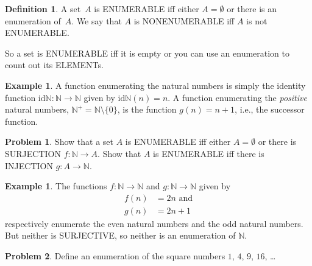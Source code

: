 \documentclass[10pt,a4paper]{article}
\newcommand*{\olup}[1]{\MakeUppercase{#1}}
\theoremstyle{plain}
\theoremstyle{definition}
\newtheorem{defn}[thm]{Definition}
\newtheorem{ex}[thm]{Example}
\newtheorem{prob}{Problem}[section]
\theoremstyle{remark}
\newenvironment{explain}{}{}
\newcommand*{\ollabel}[1]{\label{#1}}
\providecommand{\Nat}{\ensuremath{\mathbb{N}}}
\providecommand{\Id}{\mathrm{id}}
\begin{document}
\begin{defn}
  \ollabel{defn:enumerable}
  A set~$A$ is \olup{enumerable} iff either $A = \emptyset$ or there is
  an enumeration of~$A$. We say that $A$ is \olup{nonenumerable} iff $A$
  is not \olup{enumerable}.
\end{defn}

\begin{explain}
So a set is \olup{enumerable} iff it is empty or you can use an
enumeration to count out its \olup{element}s.
\end{explain}

\begin{ex}
A function enumerating the natural numbers is simply the identity
function $\Id{\Nat} \colon \Nat \to \Nat$ given by $\Id{\Nat}(n) = n$. A
function enumerating the \emph{positive} natural numbers, $\Nat^+ =
\Nat \setminus \{0\}$, is the function $g(n) = n + 1$, i.e., the
successor function.
\end{ex}

\begin{prob}
Show that a set $A$ is \olup{enumerable} iff either $A = \emptyset$ or
there is \olup{surjection} $f\colon \Nat \to A$. Show that $A$ is
\olup{enumerable} iff there is \olup{injection} $g\colon A \to \Nat$. 
\end{prob}

\begin{ex}
The functions $f\colon \Nat \to \Nat$ and $g \colon \Nat \to \Nat$
given by
\begin{align*}
  f(n) & = 2n \text{ and}\\
  g(n) & = 2n+1
\end{align*}
respectively enumerate the even natural numbers and the odd natural
numbers. But neither is \olup{surjective}, so neither is an enumeration
of $\Nat$.
\end{ex}

\begin{prob}
Define an enumeration of the square numbers $1$, $4$, $9$, $16$, \dots
\end{prob}
\end{document}
